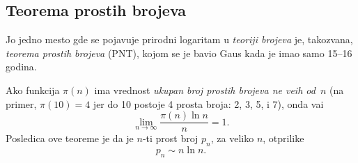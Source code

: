 \subsection{Teorema prostih brojeva}

Jo{\sv} jedno mesto gde se pojav{\lj}uje prirodni logaritam u {\sl teoriji brojeva} je,
takozvana, {\sl teorema prostih brojeva\/} (PNT), kojom se je bavio Gaus kada je
imao samo 15--16 godina.


Ako funkcija $\pi(n)$ ima vrednost {\sl ukupan broj prostih bro\-je\-va ne ve{\cc}ih od~$n$}
(na primer, $\pi(10)=4$ jer do 10 postoje 4 prosta broja: 2, 3, 5, i 7), onda va{\zv}i
$$
\lim_{n\to\infty}\frac{\pi(n)\ln n}{n} = 1.
$$
Posledica ove teoreme je da je $n$-ti prost broj $p_n$, za veliko $n$, otprilike
$$
p_n\sim n\ln n.
$$

